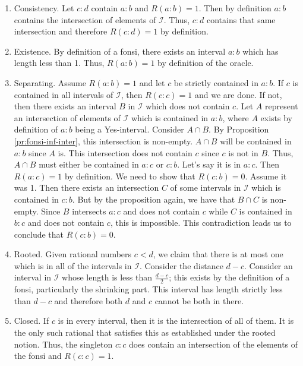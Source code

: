 \documentclass[12pt]{article}
\theoremstyle{remark}
\begin{document}
\begin{enumerate}
    \item Consistency. Let $c:d$ contain $a:b$ and $R(a:b)=1$. Then by definition $a:b$ contains the intersection of elements of $\mathcal{I}$. Thus, $c:d$ contains that same  intersection and therefore $R(c:d)=1$ by definition. 
    \item Existence. By definition of a fonsi, there exists an interval $a:b$ which has length less than 1. Thus, $R(a:b)=1$ by definition of the oracle.
    \item Separating. Assume $R(a:b)=1$ and let $c$ be strictly contained in $a:b$. If $c$ is contained in all intervals of $\mathcal{I}$, then $R(c:c) =1$ and we are done. If not, then there exists an interval $B$ in $\mathcal{I}$ which does not contain $c$.
    Let $A$ represent an intersection of elements of $\mathcal{I}$ which is contained in 
    $a:b$, where $A$ exists by definition of $a:b$ being a Yes-interval.   Consider $A \cap B$. By Proposition \ref{pr:fonsi-inf-inter}, this intersection is non-empty. $A \cap B$ will be contained in $a:b$ since $A$ is.  This intersection does not contain $c$ since $c$ is not in $B$. Thus, $A \cap B$ must either be contained in $a:c$ or $c:b$. Let's say it is in $a:c$. Then $R(a:c) = 1$ by definition. We need to show that $R(c:b) = 0$. Assume it was 1. Then there exists an intersection $C$ of some intervals in $\mathcal{I}$ which is contained in $c:b$. But by the proposition again, we have that $B \cap C$ is non-empty. Since $B$ intersects $a:c$ and does not contain $c$ while $C$ is contained in $b:c$ and does not contain $c$, this is impossible. This contradiction leads us to conclude that $R(c:b) = 0$.
    \item Rooted. Given rational numbers $c < d$, we claim that there is at most one which is in all of the intervals in $\mathcal{I}$. Consider the distance $d-c$. Consider an  interval in $\mathcal{I}$ whose length is less than $\tfrac{d-c}{2}$; this exists by the definition of a fonsi, particularly the shrinking part. This interval has length strictly less than $d-c$ and therefore both $d$ and $c$ cannot be both in there. 
    \item Closed. If $c$ is in every interval, then it is the intersection of all of them. It is the only such rational that satisfies this as established under the rooted notion. Thus, the singleton $c:c$ does contain an intersection of the elements of the fonsi and $R(c:c) = 1$. 
\end{enumerate}
\end{document}

